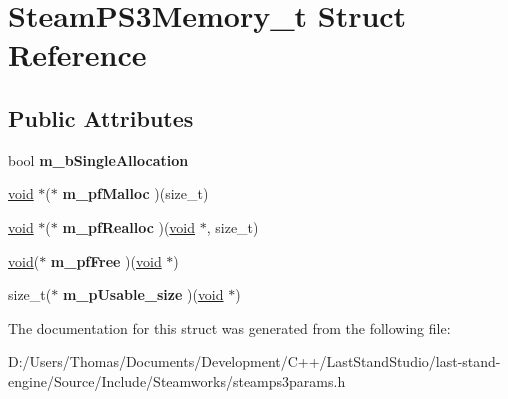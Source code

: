 \hypertarget{structSteamPS3Memory__t}{}\section{Steam\+P\+S3\+Memory\+\_\+t Struct Reference}
\label{structSteamPS3Memory__t}
\subsection*{Public Attributes}
\begin{DoxyCompactItemize}
\item 
\hypertarget{structSteamPS3Memory__t_a44b907c77800a95cbd721db75b0dbb55}{}bool {\bfseries m\+\_\+b\+Single\+Allocation}\label{structSteamPS3Memory__t_a44b907c77800a95cbd721db75b0dbb55}

\item 
\hypertarget{structSteamPS3Memory__t_af1b7ebb45f7c058b9d45cc4aa1b21b13}{}\hyperlink{SDL__audio_8h_a52835ae37c4bb905b903cbaf5d04b05f}{void} $\ast$($\ast$ {\bfseries m\+\_\+pf\+Malloc} )(size\+\_\+t)\label{structSteamPS3Memory__t_af1b7ebb45f7c058b9d45cc4aa1b21b13}

\item 
\hypertarget{structSteamPS3Memory__t_a0d84a4228b5424ffe007bec26faa0b94}{}\hyperlink{SDL__audio_8h_a52835ae37c4bb905b903cbaf5d04b05f}{void} $\ast$($\ast$ {\bfseries m\+\_\+pf\+Realloc} )(\hyperlink{SDL__audio_8h_a52835ae37c4bb905b903cbaf5d04b05f}{void} $\ast$, size\+\_\+t)\label{structSteamPS3Memory__t_a0d84a4228b5424ffe007bec26faa0b94}

\item 
\hypertarget{structSteamPS3Memory__t_a2a2933267637e0e85ccb09e1ae3ce93b}{}\hyperlink{SDL__audio_8h_a52835ae37c4bb905b903cbaf5d04b05f}{void}($\ast$ {\bfseries m\+\_\+pf\+Free} )(\hyperlink{SDL__audio_8h_a52835ae37c4bb905b903cbaf5d04b05f}{void} $\ast$)\label{structSteamPS3Memory__t_a2a2933267637e0e85ccb09e1ae3ce93b}

\item 
\hypertarget{structSteamPS3Memory__t_a0689a547d0e7370b902deb4c5ce68153}{}size\+\_\+t($\ast$ {\bfseries m\+\_\+p\+Usable\+\_\+size} )(\hyperlink{SDL__audio_8h_a52835ae37c4bb905b903cbaf5d04b05f}{void} $\ast$)\label{structSteamPS3Memory__t_a0689a547d0e7370b902deb4c5ce68153}

\end{DoxyCompactItemize}


The documentation for this struct was generated from the following file\+:\begin{DoxyCompactItemize}
\item 
D\+:/\+Users/\+Thomas/\+Documents/\+Development/\+C++/\+Last\+Stand\+Studio/last-\/stand-\/engine/\+Source/\+Include/\+Steamworks/steamps3params.\+h\end{DoxyCompactItemize}
